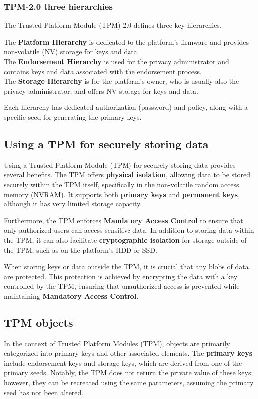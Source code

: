 \subsubsection{TPM-2.0 three hierarchies}
The Trusted Platform Module (TPM) 2.0 defines three key hierarchies. 

The \textbf{Platform Hierarchy} is dedicated to the platform’s firmware and provides non-volatile (NV) storage for keys and data.\\ The \textbf{Endorsement Hierarchy} is used for the privacy administrator and contains keys and data associated with the endorsement process.\\ The \textbf{Storage Hierarchy} is for the platform’s owner, who is usually also the privacy administrator, and offers NV storage for keys and data.

Each hierarchy has dedicated authorization (password) and policy, along with a specific seed for generating the primary keys.


\subsection{Using a TPM for securely storing data}


Using a Trusted Platform Module (TPM) for securely storing data provides several benefits. The TPM offers \textbf{physical isolation}, allowing data to be stored securely within the TPM itself, specifically in the non-volatile random access memory (NVRAM). It supports both \textbf{primary keys} and \textbf{permanent keys}, although it has very limited storage capacity.

Furthermore, the TPM enforces \textbf{Mandatory Access Control} to ensure that only authorized users can access sensitive data. In addition to storing data within the TPM, it can also facilitate \textbf{cryptographic isolation} for storage outside of the TPM, such as on the platform's HDD or SSD. 

When storing keys or data outside the TPM, it is crucial that any blobs of data are protected. This protection is achieved by encrypting the data with a key controlled by the TPM, ensuring that unauthorized access is prevented while maintaining \textbf{Mandatory Access Control}.


\subsection{TPM objects}
In the context of Trusted Platform Modules (TPM), objects are primarily categorized into primary keys and other associated elements. The \textbf{primary keys} include endorsement keys and storage keys, which are derived from one of the primary seeds. Notably, the TPM does not return the private value of these keys; however, they can be recreated using the same parameters, assuming the primary seed has not been altered.

